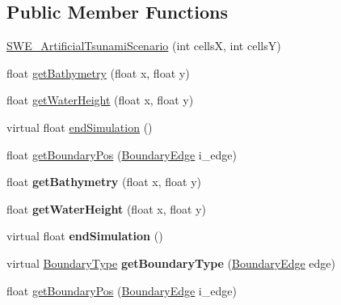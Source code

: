 \subsection*{Public Member Functions}
\begin{DoxyCompactItemize}
\item 
\hyperlink{classSWE__ArtificialTsunamiScenario_a6e180a52b20d3b1556c6c05bed61f6ab}{S\-W\-E\-\_\-\-Artificial\-Tsunami\-Scenario} (int cells\-X, int cells\-Y)
\item 
float \hyperlink{classSWE__ArtificialTsunamiScenario_acbc4c3127f531862d01c4661da144836}{get\-Bathymetry} (float x, float y)
\item 
float \hyperlink{classSWE__ArtificialTsunamiScenario_aef1c04137080ab89e437d5a912b85dcb}{get\-Water\-Height} (float x, float y)
\item 
virtual float \hyperlink{classSWE__ArtificialTsunamiScenario_ac402138d10edcbe7faec4a683de0ebdb}{end\-Simulation} ()
\item 
float \hyperlink{classSWE__ArtificialTsunamiScenario_ab61b4cb9598a368ef14c2f2a165fe56c}{get\-Boundary\-Pos} (\hyperlink{SWE__Scenario_8hh_aa5e01e3f7df312f7b9b0d02521141fcc}{Boundary\-Edge} i\-\_\-edge)
\item 
\hypertarget{classSWE__ArtificialTsunamiScenario_acbc4c3127f531862d01c4661da144836}{float {\bfseries get\-Bathymetry} (float x, float y)}\label{classSWE__ArtificialTsunamiScenario_acbc4c3127f531862d01c4661da144836}

\item 
\hypertarget{classSWE__ArtificialTsunamiScenario_aef1c04137080ab89e437d5a912b85dcb}{float {\bfseries get\-Water\-Height} (float x, float y)}\label{classSWE__ArtificialTsunamiScenario_aef1c04137080ab89e437d5a912b85dcb}

\item 
\hypertarget{classSWE__ArtificialTsunamiScenario_ac402138d10edcbe7faec4a683de0ebdb}{virtual float {\bfseries end\-Simulation} ()}\label{classSWE__ArtificialTsunamiScenario_ac402138d10edcbe7faec4a683de0ebdb}

\item 
\hypertarget{classSWE__ArtificialTsunamiScenario_af40ccfcb7986958441acd2b26e1b07dd}{virtual \hyperlink{SWE__Scenario_8hh_af75d5dd7322fa39ed0af4e7839e600f8}{Boundary\-Type} {\bfseries get\-Boundary\-Type} (\hyperlink{SWE__Scenario_8hh_aa5e01e3f7df312f7b9b0d02521141fcc}{Boundary\-Edge} edge)}\label{classSWE__ArtificialTsunamiScenario_af40ccfcb7986958441acd2b26e1b07dd}

\item 
float \hyperlink{classSWE__ArtificialTsunamiScenario_ab61b4cb9598a368ef14c2f2a165fe56c}{get\-Boundary\-Pos} (\hyperlink{SWE__Scenario_8hh_aa5e01e3f7df312f7b9b0d02521141fcc}{Boundary\-Edge} i\-\_\-edge)
\end{DoxyCompactItemize}
